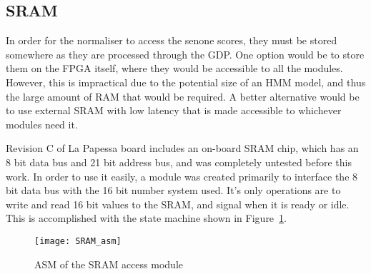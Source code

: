	\subsection{SRAM} %
	\label{sub:onboard_sram}
		In order for the normaliser to access the senone scores, they must be stored somewhere as they are processed through the GDP.  One option would be to store them on the FPGA itself, where they would be accessible to all the modules.  However, this is impractical due to the potential size of an HMM model, and thus the large amount of RAM that would be required.  A better alternative would be to use external SRAM with low latency that is made accessible to whichever modules need it.

		Revision C of La Papessa board includes an on-board SRAM chip, which has an 8 bit data bus and 21 bit address bus, and was completely untested before this work.  In order to use it easily, a module was created primarily to interface the 8 bit data bus with the 16 bit number system used.  It's only operations are to write and read 16 bit values to the SRAM, and signal when it is ready or idle.  This is accomplished with the state machine shown in Figure~\ref{fig:sram_asm}.

		\begin{figure}[tb]
			\begin{center}
				\texttt{[image: SRAM\_asm]}
			\end{center}
			\caption{ASM of the SRAM access module}
			\label{fig:sram_asm}
		\end{figure}

